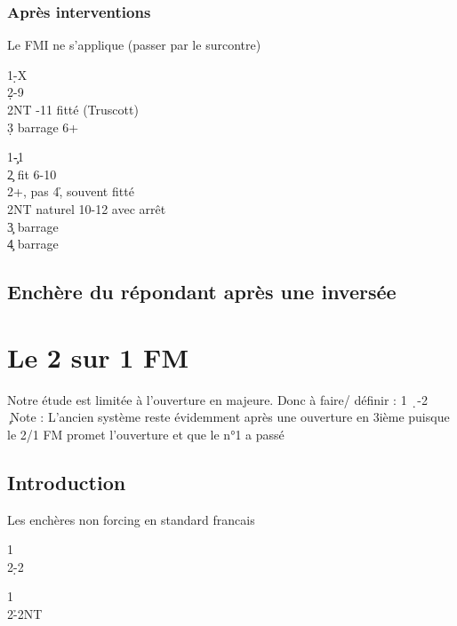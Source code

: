 \documentclass[a4paper]{article}
\begin{document}
\subsubsection{Après interventions}

Le FMI ne s'applique (passer par le surcontre)

\begin{bidtable}
1\d-X\+\\
2\d {}-9\\
2NT -11 fitté (Truscott)\\
3\d \> barrage 6+\-
\end{bidtable}

\begin{bidtable}
1\c-1\s\+\\
2\c \> fit 6-10\\
2\s {}+, pas 4\h , souvent fitté \c \\
2NT \> naturel 10-12 avec arrêt\\
3\c \> barrage\\
4\c \> barrage\-
\end{bidtable}

\subsection{Enchère du répondant après une inversée}

\section{Le 2 sur 1 FM}

Notre étude est limitée à l’ouverture en majeure. 
Donc à faire/ définir : 1 \d\ -2 \c\ 
Note : 
L’ancien système reste évidemment après une ouverture en 3ième puisque le 2/1 FM promet 
l’ouverture et que le n°1 a passé

\subsection{Introduction}

Les enchères non forcing en standard francais

\begin{bidtable}
1\c\\
2\d-2\s
\end{bidtable}

\begin{bidtable}
1\c\\
2\h-2NT
\end{bidtable}
\end{document}
